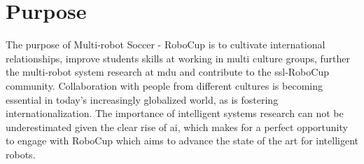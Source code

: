 \section{Purpose}
\label{section:purpose}

The purpose of Multi-robot Soccer - RoboCup is to cultivate international relationships, improve students skills at working in multi culture groups, further the multi-robot system research at \ac{mdu} and contribute to the \ac{ssl}-RoboCup community. Collaboration with people from different cultures is becoming essential in today's increasingly globalized world, as is fostering internationalization. The importance of intelligent systems research can not be underestimated given the clear rise of \ac{ai}, which makes for a perfect opportunity to engage with RoboCup which aims to advance the state of the art for intelligent robots\:\cite{robocup_small_size_league_small_nodate}.

